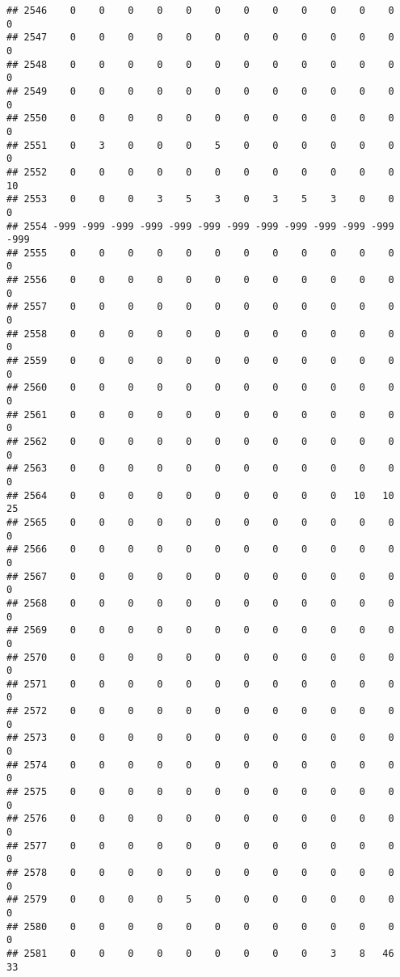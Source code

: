 \documentclass[]{article}
\begin{document}
\begin{verbatim}
## 2546    0    0    0    0    0    0    0    0    0    0    0    0    0
## 2547    0    0    0    0    0    0    0    0    0    0    0    0    0
## 2548    0    0    0    0    0    0    0    0    0    0    0    0    0
## 2549    0    0    0    0    0    0    0    0    0    0    0    0    0
## 2550    0    0    0    0    0    0    0    0    0    0    0    0    0
## 2551    0    3    0    0    0    5    0    0    0    0    0    0    0
## 2552    0    0    0    0    0    0    0    0    0    0    0    0   10
## 2553    0    0    0    3    5    3    0    3    5    3    0    0    0
## 2554 -999 -999 -999 -999 -999 -999 -999 -999 -999 -999 -999 -999 -999
## 2555    0    0    0    0    0    0    0    0    0    0    0    0    0
## 2556    0    0    0    0    0    0    0    0    0    0    0    0    0
## 2557    0    0    0    0    0    0    0    0    0    0    0    0    0
## 2558    0    0    0    0    0    0    0    0    0    0    0    0    0
## 2559    0    0    0    0    0    0    0    0    0    0    0    0    0
## 2560    0    0    0    0    0    0    0    0    0    0    0    0    0
## 2561    0    0    0    0    0    0    0    0    0    0    0    0    0
## 2562    0    0    0    0    0    0    0    0    0    0    0    0    0
## 2563    0    0    0    0    0    0    0    0    0    0    0    0    0
## 2564    0    0    0    0    0    0    0    0    0    0   10   10   25
## 2565    0    0    0    0    0    0    0    0    0    0    0    0    0
## 2566    0    0    0    0    0    0    0    0    0    0    0    0    0
## 2567    0    0    0    0    0    0    0    0    0    0    0    0    0
## 2568    0    0    0    0    0    0    0    0    0    0    0    0    0
## 2569    0    0    0    0    0    0    0    0    0    0    0    0    0
## 2570    0    0    0    0    0    0    0    0    0    0    0    0    0
## 2571    0    0    0    0    0    0    0    0    0    0    0    0    0
## 2572    0    0    0    0    0    0    0    0    0    0    0    0    0
## 2573    0    0    0    0    0    0    0    0    0    0    0    0    0
## 2574    0    0    0    0    0    0    0    0    0    0    0    0    0
## 2575    0    0    0    0    0    0    0    0    0    0    0    0    0
## 2576    0    0    0    0    0    0    0    0    0    0    0    0    0
## 2577    0    0    0    0    0    0    0    0    0    0    0    0    0
## 2578    0    0    0    0    0    0    0    0    0    0    0    0    0
## 2579    0    0    0    0    5    0    0    0    0    0    0    0    0
## 2580    0    0    0    0    0    0    0    0    0    0    0    0    0
## 2581    0    0    0    0    0    0    0    0    0    3    8   46   33

\end{verbatim}
\end{document}
